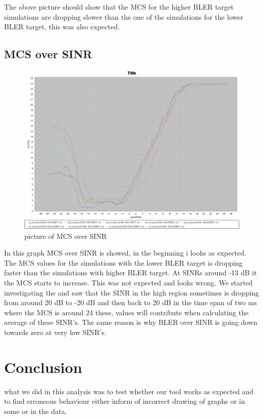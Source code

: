 \documentclass[cropmarks, frame, english]{idamasterthesis}
\begin{document}
The above picture should show that the MCS for the higher BLER target simulations are dropping slower than the one of the simulations for the lower BLER target, this was also expected.

\newpage

\subsection{MCS over SINR}

\begin{figure}[h]
\includegraphics[width=\textwidth]{ulMCSOverSINR}
\centering
\caption{picture of MCS over SINR}
\end{figure}

In this graph MCS over SINR is showed, in the beginning i looks as expected. The MCS values for the simulations with the lower BLER target is dropping faster than the simulations with higher BLER target. At SINRs around -13 dB it the MCS starts to increase. This was not expected and looks wrong. We started investigating the and saw that the SINR in the high region sometimes is dropping from around 20 dB to -20 dB  and then back to 20 dB in the time span of two ms where the MCS is around 24 these, values will contribute when calculating the average of these SINR's. The same reason is why BLER over SINR is going down towards zero at very low SINR's.


\section{Conclusion}
what we did in this analysis was to test whether our tool works as expected and to find erroneous behaviour either inform of incorrect drawing of graphs or in some or in the data. \\
\end{document}
